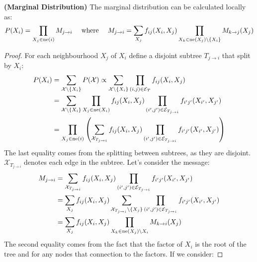 \begin{proposition}{\textbf{(Marginal Distribution)}}
    The marginal distribution can be calculated locally as:
    \begin{equation*}
        P(X_i) = \prod_{X_j \in \operatorname{ne}(i)} M_{j\rightarrow i} \quad \text{ where } \quad M_{j\rightarrow i} = \sum_{X_j}f_{ij}(X_i, X_j) \prod_{X_k \in \operatorname{ne}(X_j)\backslash\left\{ X_i \right\}} M_{k\rightarrow j}(X_j)
    \end{equation*}
\end{proposition}    
\begin{proof}
    For each neighbourhood $X_j$ of $X_i$ define a disjoint subtree $T_{j\rightarrow i}$ that split by $X_i$:
    \begin{equation*}
    \begin{aligned}
        P(X_i) &= \sum_{\mathcal{X}\backslash\left\{ X_i \right\}} P(\mathcal{X}) \propto \sum_{\mathcal{X}\backslash\left\{ X_i \right\}}\prod_{(i, j)\in \mathcal{E}_T} f_{ij}(X_{i}, X_{j}) \\
        &= \sum_{\mathcal{X}\backslash\left\{ X_i \right\}}\prod_{X_j \in \operatorname{ne}(X_i)}f_{ij}(X_i, X_j)\prod_{(i', j')\in\mathcal{E}_{T_{j\rightarrow i}}}f_{i'j'}(X_{i'}, X_{j'}) \\
        &= \prod_{X_j \in \operatorname{ne}(i)} \left( \sum_{\mathcal{X}_{T_{j\rightarrow i}}} f_{ij}(X_i, X_j) \prod_{(i',j')\in\mathcal{E}_{T_{j\rightarrow i}}} f_{i'j'}(X_{i'}, X_{j'})  \right)
    \end{aligned}
    \end{equation*}
    The last equality comes from the splitting between subtrees, as they are disjoint. $\mathcal{X}_{T_{j\rightarrow i}}$ denotes each edge in the subtree. Let's consider the message:
    \begin{equation*}
    \begin{aligned} 
        M_{j\rightarrow i} 
        &= \sum_{\mathcal{X}_{T_{j\rightarrow i}}} f_{ij}(X_i, X_j) \prod_{(i',j')\in\mathcal{E}_{T_{j\rightarrow i}}} f_{i'j'}(X_{i'}, X_{j'})  \\ 
        &= \sum_{X_j} f_{ij}(X_i, X_j)\sum_{\mathcal{X}_{T_{j\rightarrow i}}\backslash \left\{ X_j \right\}} \prod_{(i',j')\in\mathcal{E}_{T_{j\rightarrow i}}} f_{i'j'}(X_{i'}, X_{j'}) \\
        &= \sum_{X_j} f_{ij}(X_i, X_j) \prod_{X_{k}\in\operatorname{ne}(X_j)\backslash X_i} M_{k\rightarrow i}(X_j)
    \end{aligned}
    \end{equation*}
    The second equality comes from the fact that the factor of $X_i$ is the root of the tree and for any nodes that connection to the factors. If we consider:

\end{proof}
